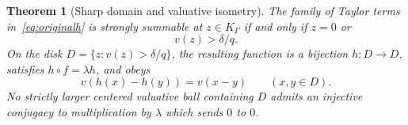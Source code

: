 \documentclass[11pt,a4paper]{article}
\numberwithin{equation}{section}
\newtheorem{theorem}{Theorem}[section]
\theoremstyle{definition}
\theoremstyle{remark}
\newcommand{\K}{K_\Gamma}
\begin{document}
\begin{theorem}[Sharp domain and valuative isometry]
\label{thm:sharp}
The family of Taylor terms in~\eqref{eq:originalh} is strongly summable at
$z\in\K$ if and only if $z=0$ or
\begin{equation}\label{eq:sharpdomain}
 v(z)>\delta/q.
\end{equation}
On the disk $D=\{z:v(z)>\delta/q\}$, the resulting function is a bijection
$h:D\to D$, satisfies $h\circ f=\lambda h$, and obeys
\begin{equation}\label{eq:isometry}
 v(h(x)-h(y))=v(x-y)\qquad(x,y\in D).
\end{equation}
No strictly larger centered valuative ball containing $D$ admits an
injective conjugacy to multiplication by $\lambda$ which sends $0$ to $0$.
\end{theorem}
\end{document}
